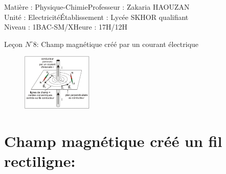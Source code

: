 \documentclass[12pt]{article}
\author{Zakaria HAOUZAN}
\date{\today}
\newcommand\headerMe[2]{\noindent{}#1\hfill#2}
\begin{document}
\headerMe{Matière : Physique-Chimie}{Professeur : Zakaria HAOUZAN}\\
\headerMe{Unité : Electricité}{Établissement : Lycée SKHOR qualifiant}\\
\headerMe{Niveau : 1BAC-SM/X}{Heure : 17H/12H}\\




\begin{center}

    \Large{Leçon $N^{\circ} 8 $: \color{red}Champ magnétique créé par un courant électrique }
\end{center}

\begin{figure}
  \vspace{-3cm}
    \includegraphics[width=0.3\textwidth]{./img/Un fil de longueur.png}
\end{figure}
  \section{ Champ magnétique créé un fil rectiligne:}
\end{document}
